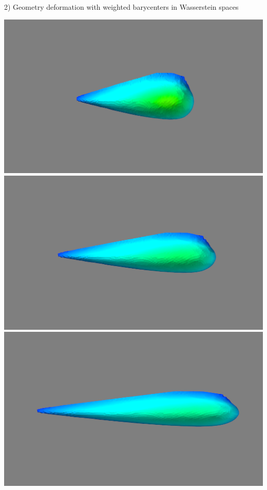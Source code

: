 \documentclass[b0paper,portrait]{baposter}
\begin{document}
\begin{poster}
\begin{posterbox}[name=otm,below=introduction,span=6,column=0]{2) Geometry deformation with weighted barycenters in Wasserstein spaces}
\begin{minipage}{0.46\textwidth}
\begin{center}
\end{center}
\begin{center} \includegraphics[scale=0.1]{figure_b}   \quad \includegraphics[scale=0.1]{figure_bc}  \quad \includegraphics[scale=0.1]{figure_c} \\

\end{center}
\end{minipage}
\end{posterbox}


\end{poster}
\end{document}
